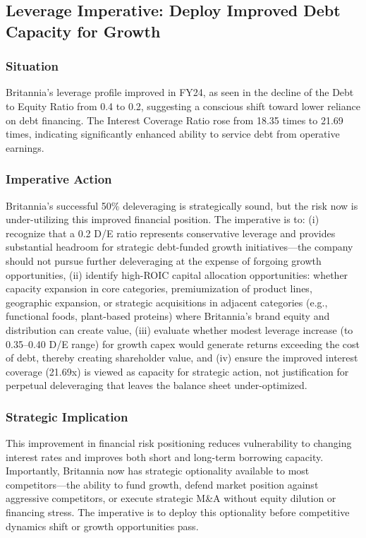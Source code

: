 \documentclass[12pt, a4paper]{report}
\begin{document}
\subsection{Leverage Imperative: Deploy Improved Debt Capacity for Growth}

\subsubsection{Situation}
Britannia's leverage profile improved in FY24, as seen in the decline of the Debt to Equity Ratio from 0.4 to 0.2, suggesting a conscious shift toward lower reliance on debt financing. The Interest Coverage Ratio rose from 18.35 times to 21.69 times, indicating significantly enhanced ability to service debt from operative earnings.

\subsubsection{Imperative Action}
Britannia's successful 50\% deleveraging is strategically sound, but the risk now is under-utilizing this improved financial position. The imperative is to: (i) recognize that a 0.2 D/E ratio represents conservative leverage and provides substantial headroom for strategic debt-funded growth initiatives—the company should not pursue further deleveraging at the expense of forgoing growth opportunities, (ii) identify high-ROIC capital allocation opportunities: whether capacity expansion in core categories, premiumization of product lines, geographic expansion, or strategic acquisitions in adjacent categories (e.g., functional foods, plant-based proteins) where Britannia's brand equity and distribution can create value, (iii) evaluate whether modest leverage increase (to 0.35–0.40 D/E range) for growth capex would generate returns exceeding the cost of debt, thereby creating shareholder value, and (iv) ensure the improved interest coverage (21.69x) is viewed as capacity for strategic action, not justification for perpetual deleveraging that leaves the balance sheet under-optimized.

\subsubsection{Strategic Implication}
This improvement in financial risk positioning reduces vulnerability to changing interest rates and improves both short and long-term borrowing capacity. Importantly, Britannia now has strategic optionality available to most competitors—the ability to fund growth, defend market position against aggressive competitors, or execute strategic M\&A without equity dilution or financing stress. The imperative is to deploy this optionality before competitive dynamics shift or growth opportunities pass.
\end{document}
